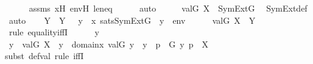 \begin{isabellebody}
\ \ \ \ \isamarkupfalse%
\ assms\ x{\isacharprime}{\kern0pt}H\ env{\isacharprime}{\kern0pt}H\ leneq\isanewline
\ \ \ \ \isamarkupfalse%
\ auto\isanewline
\ \ \isamarkupfalse%
\ \isamarkupfalse%
\ {\isachardoublequoteopen}val{\isacharparenleft}{\kern0pt}G{\isacharcomma}{\kern0pt}\ X{\isacharparenright}{\kern0pt}\ {\isasymin}\ SymExt{\isacharparenleft}{\kern0pt}G{\isacharparenright}{\kern0pt}{\isachardoublequoteclose}\ \isamarkupfalse%
\ SymExt{\isacharunderscore}{\kern0pt}def\ \isamarkupfalse%
\ auto\isanewline
\isanewline
\ \ \isamarkupfalse%
\ Y\ \ {\isachardoublequoteopen}Y\ {\isasymequiv}\ {\isacharbraceleft}{\kern0pt}\ y\ {\isasymin}\ x{\isachardot}{\kern0pt}\ sats{\isacharparenleft}{\kern0pt}SymExt{\isacharparenleft}{\kern0pt}G{\isacharparenright}{\kern0pt}{\isacharcomma}{\kern0pt}\ {\isasymphi}{\isacharcomma}{\kern0pt}\ {\isacharbrackleft}{\kern0pt}y{\isacharbrackright}{\kern0pt}\ {\isacharat}{\kern0pt}\ env{\isacharparenright}{\kern0pt}\ {\isacharbraceright}{\kern0pt}{\isachardoublequoteclose}\ \isanewline
\isanewline
\ \ \isamarkupfalse%
\ {\isachardoublequoteopen}val{\isacharparenleft}{\kern0pt}G{\isacharcomma}{\kern0pt}\ X{\isacharparenright}{\kern0pt}\ {\isacharequal}{\kern0pt}\ Y{\isachardoublequoteclose}\ \isanewline
\ \ \isamarkupfalse%
\ {\isacharparenleft}{\kern0pt}rule\ equality{\isacharunderscore}{\kern0pt}iffI{\isacharparenright}{\kern0pt}\isanewline
\ \ \ \ \isamarkupfalse%
\ y\isanewline
\isanewline
\ \ \ \ \isamarkupfalse%
\ {\isachardoublequoteopen}y\ {\isasymin}\ val{\isacharparenleft}{\kern0pt}G{\isacharcomma}{\kern0pt}\ X{\isacharparenright}{\kern0pt}\ {\isasymlongleftrightarrow}\ {\isacharparenleft}{\kern0pt}{\isasymexists}y{\isacharprime}{\kern0pt}\ {\isasymin}\ domain{\isacharparenleft}{\kern0pt}x{\isacharprime}{\kern0pt}{\isacharparenright}{\kern0pt}{\isachardot}{\kern0pt}\ val{\isacharparenleft}{\kern0pt}G{\isacharcomma}{\kern0pt}\ y{\isacharprime}{\kern0pt}{\isacharparenright}{\kern0pt}\ {\isacharequal}{\kern0pt}\ y\ {\isasymand}\ {\isacharparenleft}{\kern0pt}{\isasymexists}p\ {\isasymin}\ G{\isachardot}{\kern0pt}\ {\isacharless}{\kern0pt}y{\isacharprime}{\kern0pt}{\isacharcomma}{\kern0pt}\ p{\isachargreater}{\kern0pt}\ {\isasymin}\ X{\isacharparenright}{\kern0pt}{\isacharparenright}{\kern0pt}{\isachardoublequoteclose}\isanewline
\ \ \ \ \ \ \isamarkupfalse%
{\isacharparenleft}{\kern0pt}subst\ def{\isacharunderscore}{\kern0pt}val{\isacharcomma}{\kern0pt}\ rule\ iffI{\isacharparenright}{\kern0pt}\isanewline

\end{isabellebody}

